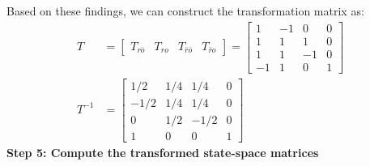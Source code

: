 \documentclass[twoside, 11pt, a4paper]{article}
\begin{document}
Based on these findings, we can construct the transformation matrix as:
%
\begin{align*}
   T &= \left[ \begin{array}{c|c|c|c} T_{r\bar{o}} & T_{ro} & T_{\bar{r} \bar{o}} & T_{\bar{r} o} \end{array} \right] 
   = \left[ \begin{array}{c|c|c|c} 1 & -1 & 0 & 0
   \\
   1 & 1 & 1 & 0
   \\
   1 & 1 & -1 & 0
   \\
   -1 & 1 & 0 & 1
   \end{array} \right] 
   \\
   T^{-1} &= \left[ \begin{array}{c|c|c|c} 1/2 & 1/4 & 1/4 & 0
   \\
   -1/2 & 1/4 & 1/4 & 0
   \\
   0 & 1/2 & -1/2 & 0
   \\
   1 & 0 & 0 & 1
   \end{array} \right] 
\end{align*}
%
\textbf{Step 5: Compute the transformed state-space matrices}
\end{document}
